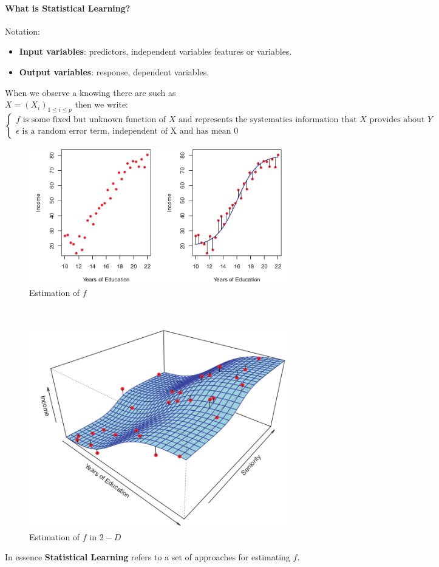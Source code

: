 \paragraph{What is Statistical Learning?}
Notation:
\begin{itemize}
 \item \textbf{Input variables}: predictors, independent variables
   features or variables.
 \item \textbf{Output variables}: response, dependent variables.
\end{itemize}
When we observe a  knowing there are 
 such as\\
$X=\left( X_{i} \right)_{1\leq i\leq p}$ then we write:
\\
$\begin{cases}
f\text{ is some fixed but unknown function of }X\text{ 
and represents the systematics information that }X\text{ provides
about }Y\\
\epsilon\text{ is a random error term, independent of X and has mean }0
\end{cases}
$
\begin{figure}[h]
  \centering
  \includegraphics[width=.5\textwidth]{./chap/1chap/1sec/1images/1_1estimationOfF.png}
  \caption{Estimation of $f$}
  \label{fig:1.1}
\end{figure}\\
\begin{figure}[H]
  \centering
  \includegraphics[width=.5\textwidth]{./chap/1chap/1sec/1images/1_2estimationF2D.png}
  \caption{Estimation of $f$ in $2-D$}
  \label{fig:1.1}
\end{figure}
In essence \textbf{Statistical Learning} refers to a set of approaches
for estimating $f$.
